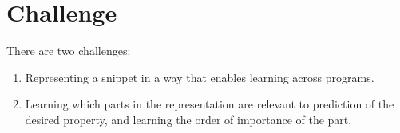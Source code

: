 \section{Challenge}\label{sec:chal}
\begin{frame}{}
\justifying
There are two challenges: %
    \begin{enumerate}
        \item Representing a snippet in a way that enables learning across programs.
        \item Learning which parts in the representation are relevant to prediction of the desired property, and learning the order of importance of the part.
    \end{enumerate}
\end{frame}